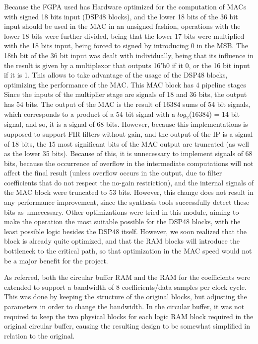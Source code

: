 \documentclass[12pt]{article}
\begin{document}
Because the FGPA used has Hardware optimized for the computation of MACs with signed 18 bits input (DSP48 blocks), and the lower 18 bits of the 36 bit
input should be used in the MAC in an unsigned fashion, operations with the lower 18 bits were
further divided, being that the lower 17 bits were multiplied with the 18 bits input, being forced
to signed by introducing 0 in the MSB. The 18th bit of the 36 bit input was dealt with individually,
being that its influence in the result is given by a multiplexor that outputs 16'b0 if it 0, or the
16 bit input if it is 1. This allows to take advantage of the usage of the DSP48 blocks, optimizing
the performance of the MAC. This MAC block has 4 pipeline stages Since the inputs of the multiplier
stage are signals of 18 and 36 bits, the output has 54 bits. The output of the MAC is the result of
16384 sums of 54 bit signals, which corresponds to a product of a 54 bit signal with a
$log_2$(16384) = 14 bit signal, and so, it is a signal of 68 bits. However, because this
implementations is supposed to support FIR filters without gain, and the output of the IP is a
signal of 18 bits, the 15 most significant bits of the MAC output are truncated (as well as the
lower 35 bits). Because of this, it is unnecessary to implement signals of 68 bits, because the
occurrence of overflow in the intermediate computations will not affect the final result (unless
overflow occurs in the output, due to filter coefficients that do not respect the no-gain
restriction), and the internal signals of the MAC block were truncated to 53 bits. However, this
change does not result in any performance improvement, since the synthesis tools successfully detect
these bits as unnecessary. Other optimizations were tried in this module, aiming to make the
operation the most suitable possible for the DSP48 blocks, with the least possible logic besides the
DSP48 itself. However, we soon realized that the block is already quite optimized, and that the RAM
blocks will introduce the bottleneck to the critical path, so that optimization in the MAC speed
would not be a major benefit for the project.

As referred, both the circular buffer RAM and the RAM for the coefficients were extended to support
a bandwidth of 8 coefficients/data samples per clock cycle. This was done by keeping the structure
of the original blocks, but adjusting the parameters in order to change the bandwidth. In the
circular buffer, it was not required to keep the two physical blocks for each logic RAM block
required in the original circular buffer, causing the resulting design to be somewhat simplified in
relation to the original.
\end{document}
